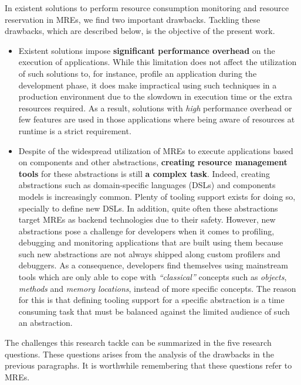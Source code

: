 In existent solutions to perform resource consumption monitoring and resource reservation in MREs, we find two important drawbacks.
Tackling these drawbacks, which are described below, is the objective of the present work.

\begin{itemize}
\item Existent solutions impose \textbf{significant performance overhead} on the execution of applications.
While this limitation does not affect the utilization of such solutions to, for instance, profile an application during the development phase, it does make impractical using such techniques in a production environment due to the slowdown in execution time or the extra resources required.
As a result, solutions with \textit{high} performance overhead or few features are used in those applications where being aware of resources at runtime is a strict requirement.

\item Despite of the widespread utilization of MREs to execute applications based on components and other abstractions, \textbf{creating resource management tools} for these abstractions is still \textbf{a complex task}.
Indeed, creating abstractions such as domain-specific languages (DSLs) and components models is increasingly common.
Plenty of tooling support exists for doing so, specially to define new DSLs.
In addition, quite often these abstractions target MREs as backend technologies due to their safety.
However, new abstractions pose a challenge for developers when it comes to profiling, debugging and monitoring applications that are built using them because such new abstractions are not always shipped along custom profilers and debuggers.
As a consequence, developers find themselves using mainstream tools which are only able to cope with \textit{``classical''} concepts such as \textit{objects}, \textit{methods} and \textit{memory locations}, instead of more specific concepts.
The reason for this is that defining tooling support for a specific abstraction is a time consuming task that must be balanced against the limited audience of such an abstraction.
\end{itemize}
 
The challenges this research tackle can be summarized in the five research questions.
These questions arises from the analysis of the drawbacks in the previous paragraphs.
It is worthwhile remembering that these questions refer to MREs.

